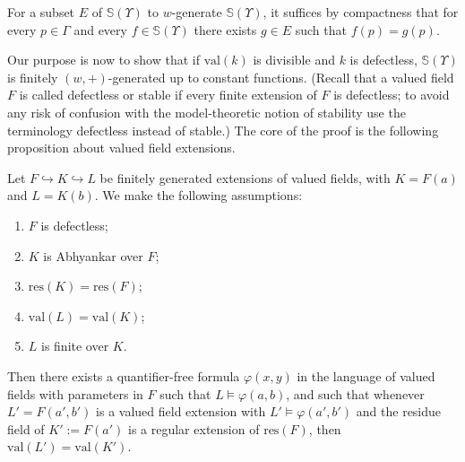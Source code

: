 \documentclass[JEP,XML,SOM,Unicode,ThmDefs,NoEqCountersInSection,published]{cedram}
\newcommand{\val}{\mathrm{val}}
\renewcommand{\SS}{\mathbb S}
\let\phi\varphi
\theoremstyle{plain}
\theoremstyle{definition}
\begin{document}
\begin{rema}
For a subset $E$ of
$\SS(\Upsilon)$ to $w$-generate $\SS(\Upsilon)$, it suffices by compactness that for every $p\in \Gamma$
and every $f\in \SS(\Upsilon)$ there exists $g\in E$ such that $f(p)=g(p)$.
\end{rema}

Our purpose is now to show that if $\val (k)$ is divisible
and $k$ is defectless, $\SS(\Upsilon)$ is finitely $(w,+)$-generated up to constant functions.
(Recall
that a valued field $F$
is called defectless or stable if
every finite extension of $F$ is defectless; to avoid any risk
of confusion with the model-theoretic
notion of stability use the terminology defectless instead of stable.)
The core of the proof is the following proposition about valued field extensions.

\begin{prop}\label{prop-formula-valuegroup}
Let $F\hookrightarrow K\hookrightarrow L$ be finitely generated extensions of
valued fields, with $K=F(a)$ and $L=K(b)$.
We make the following assumptions:
\begin{enumerate}
\item $F$ is defectless;
\item $K$ is Abhyankar over $F$;
\item $\mathrm{res}(K)=\mathrm{res}(F)$;
\item $\val (L)=\val(K)$;
\item $L$ is finite over $K$.
\end{enumerate}

Then there exists a quantifier-free formula $\phi(x,y)$ in the language of valued fields
with parameters in $F$ such that $L\models \phi(a,b)$, and such that whenever $L'=F(a',b')$ is a valued
field extension with $L'\models \phi(a',b')$ and the residue field of
$K':=F(a')$ is a regular extension of $\mathrm{res}(F)$, then
$\val(L')=\val(K')$.
\end{prop}
\end{document}
